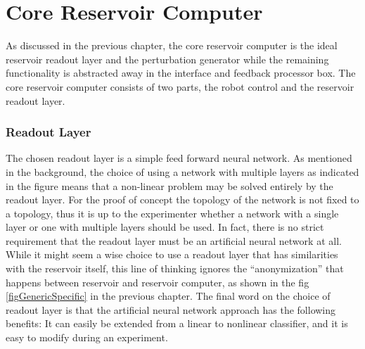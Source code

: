 \section{Core Reservoir Computer}
As discussed in the previous chapter, the core reservoir computer is the
ideal reservoir readout layer and the perturbation generator while the remaining
functionality is abstracted away in the interface and feedback processor box.
The core reservoir computer consists of two parts, the robot control and the
reservoir readout layer.
\subsubsection{Readout Layer}
The chosen readout layer is a simple feed forward neural network.
As mentioned in the background, the choice of using a network with multiple
layers as indicated in the figure means that a non-linear problem may be solved
entirely by the readout layer.
For the proof of concept the topology of the network is not fixed to a topology,
thus it is up to the experimenter whether a network with a single layer or one
with multiple layers should be used.
In fact, there is no strict requirement that the readout layer must be an
artificial neural network at all.
While it might seem a wise choice to use a readout layer that has similarities
with the reservoir itself, this line of thinking ignores the ``anonymization''
that happens between reservoir and reservoir computer, as shown in the fig
\ref{figGenericSpecific} in the previous chapter.
The final word on the choice of readout layer is that the artificial neural
network approach has the following benefits:
It can easily be extended from a linear to nonlinear classifier, and it is easy
to modify during an experiment.
